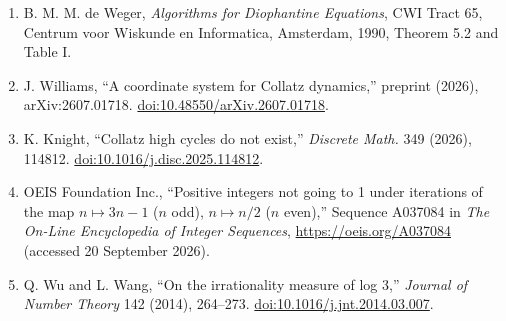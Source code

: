 \documentclass[12pt]{article}
\begin{document}
\begin{enumerate}
\item
  B. M. M. de Weger, \emph{Algorithms for Diophantine Equations}, CWI
  Tract 65, Centrum voor Wiskunde en Informatica, Amsterdam, 1990,
  Theorem 5.2 and Table I.
\item
  J. Williams, ``A coordinate system for Collatz dynamics,'' preprint
  (2026), arXiv:2607.01718.
  \href{https://doi.org/10.48550/arXiv.2607.01718}{doi:10.48550/arXiv.2607.01718}.
\item
  K. Knight, ``Collatz high cycles do not exist,'' \emph{Discrete Math.}
  349 (2026), 114812.
  \href{https://doi.org/10.1016/j.disc.2025.114812}{doi:10.1016/j.disc.2025.114812}.
\item
  OEIS Foundation Inc., ``Positive integers not going to 1 under
  iterations of the map \(n\mapsto 3n-1\) (\(n\) odd), \(n\mapsto n/2\)
  (\(n\) even),'' Sequence A037084 in \emph{The On-Line Encyclopedia of
  Integer Sequences}, \url{https://oeis.org/A037084} (accessed 20
  September 2026).
\item
  Q. Wu and L. Wang, ``On the irrationality measure of log 3,''
  \emph{Journal of Number Theory} 142 (2014), 264--273.
  \href{https://doi.org/10.1016/j.jnt.2014.03.007}{doi:10.1016/j.jnt.2014.03.007}.
\end{enumerate}

\endgroup
\end{document}
